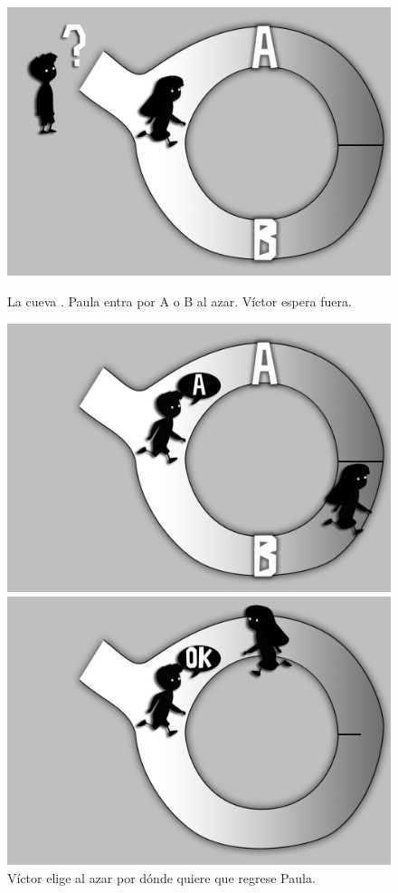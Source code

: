 \begin{figure}[!htb]
	\includegraphics[width=\linewidth]{gfx/graficoJL_ZKP_1}
	\caption*{La cueva \citep{ZKPcave:fig}. Paula entra por A o B al azar. Víctor espera fuera.}\label{fig:awesome_image1}
	\endminipage\hfill
	\includegraphics[width=\linewidth]{gfx/graficoJL_ZKP_2}
	\caption*{Víctor elige al azar por dónde quiere que regrese Paula.}\label{fig:awesome_image2}
	\endminipage\hfill
	\includegraphics[width=\linewidth]{gfx/graficoJL_ZKP_3}

\end{figure}
